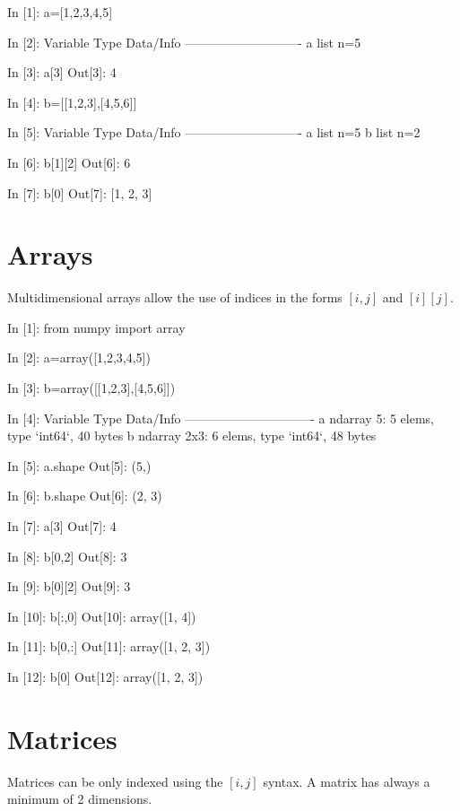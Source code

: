 \begin{code}
In [1]: a=[1,2,3,4,5]

In [2]: %
Variable   Type    Data/Info
----------------------------
a          list    n=5

In [3]: a[3]
Out[3]: 4

In [4]: b=[[1,2,3],[4,5,6]]

In [5]: %
Variable   Type    Data/Info
----------------------------
a          list    n=5
b          list    n=2

In [6]: b[1][2]
Out[6]: 6

In [7]: b[0]
Out[7]: [1, 2, 3]
\end{code}

\section{Arrays}
Multidimensional arrays allow the use of indices in the forms $[i,j]$ and 
$[i][j]$.

\begin{code}
In [1]: from numpy import array

In [2]: a=array([1,2,3,4,5])

In [3]: b=array([[1,2,3],[4,5,6]])

In [4]: %
Variable   Type       Data/Info
-------------------------------
a          ndarray    5: 5 elems, type `int64`, 40 bytes
b          ndarray    2x3: 6 elems, type `int64`, 48 bytes
\end{code}

\begin{code}
In [5]: a.shape
Out[5]: (5,)

In [6]: b.shape
Out[6]: (2, 3)

In [7]: a[3]
Out[7]: 4

In [8]: b[0,2]
Out[8]: 3

In [9]: b[0][2]
Out[9]: 3

In [10]: b[:,0]
Out[10]: array([1, 4])

In [11]: b[0,:]
Out[11]: array([1, 2, 3])

In [12]: b[0]
Out[12]: array([1, 2, 3])
\end{code}

\section{Matrices}
Matrices can be only indexed using the $[i,j]$ syntax. A matrix has always a 
minimum of 2 dimensions.

